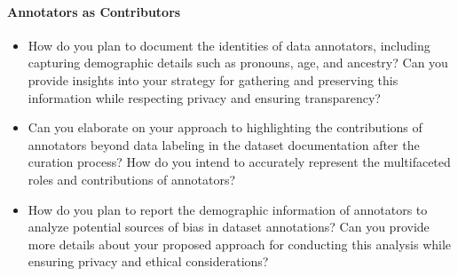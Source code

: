 \paragraph{Annotators as Contributors}
\begin{itemize}
  \item How do you plan to document the identities of data annotators, including
  capturing demographic details such as pronouns, age, and ancestry? Can you provide
  insights into your strategy for gathering and preserving this information while
  respecting privacy and ensuring transparency?
  \item Can you elaborate on your approach to highlighting the contributions of
  annotators beyond data labeling in the dataset documentation after the curation
  process? How do you intend to accurately represent the multifaceted roles and
  contributions of annotators?
  \item How do you plan to report the demographic information of annotators to
  analyze potential sources of bias in dataset annotations? Can you provide more
  details about your proposed approach for conducting this analysis while ensuring
  privacy and ethical considerations?
\end{itemize}

